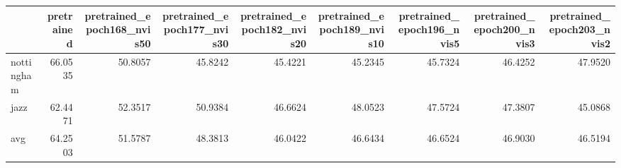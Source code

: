 \begin{tabular}{lrrrrrrrr}
\toprule
 & pretrained & pretrained_epoch168_nvis50 & pretrained_epoch177_nvis30 & pretrained_epoch182_nvis20 & pretrained_epoch189_nvis10 & pretrained_epoch196_nvis5 & pretrained_epoch200_nvis3 & pretrained_epoch203_nvis2 \\
\midrule
nottingham & 66.0535 & 50.8057 & 45.8242 & 45.4221 & 45.2345 & 45.7324 & 46.4252 & 47.9520 \\
jazz & 62.4471 & 52.3517 & 50.9384 & 46.6624 & 48.0523 & 47.5724 & 47.3807 & 45.0868 \\
avg & 64.2503 & 51.5787 & 48.3813 & 46.0422 & 46.6434 & 46.6524 & 46.9030 & 46.5194 \\
\bottomrule
\end{tabular}
